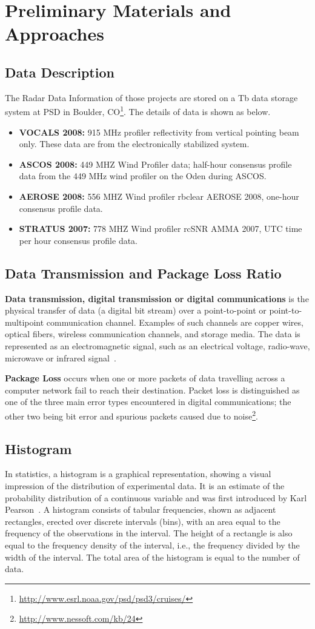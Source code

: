 \documentclass[times, 10pt,onecolumn]{article} %
\begin{document}
\section{Preliminary Materials and Approaches}
\subsection{Data Description}
The Radar Data Information of those projects are stored on a Tb data storage system at PSD in Boulder, CO\footnote{\url{http://www.esrl.noaa.gov/psd/psd3/cruises/}}. The details of data is shown as below.
\begin{itemize}
  \item \textbf{VOCALS 2008:} 915 MHz profiler reflectivity from vertical pointing beam only. These data are from the electronically stabilized system. 
\item \textbf{ASCOS 2008:} 449 MHZ Wind Profiler data; half-hour consensus profile data from the 449 MHz wind profiler on the Oden during ASCOS.  
\item \textbf{AEROSE 2008:} 556 MHZ Wind profiler rbclear AEROSE 2008, one-hour consensus profile data.
\item \textbf{STRATUS 2007:} 778 MHZ Wind profiler rcSNR AMMA 2007, UTC time per hour consensus profile data.
\end{itemize}
\subsection{Data Transmission and Package Loss Ratio}
\textbf{Data transmission, digital transmission or digital communications} is the physical transfer of data (a digital bit stream) over a point-to-point or point-to-multipoint communication channel. Examples of such channels are copper wires, optical fibers, wireless communication channels, and storage media. The data is represented as an electromagnetic signal, such as an electrical voltage, radio-wave, microwave or infrared signal~\cite{PDAT}. 

\textbf{Package Loss} occurs when one or more packets of data travelling across a computer network fail to reach their destination. Packet loss is distinguished as one of the three main error types encountered in digital communications; the other two being bit error and spurious packets caused due to noise\footnote{\url{http://www.nessoft.com/kb/24}}.
\subsection{Histogram}
In statistics, a histogram is a graphical representation, showing a visual impression of the distribution of experimental data. It is an estimate of the probability distribution of a continuous variable and was first introduced by Karl Pearson~\cite{hist}. A histogram consists of tabular frequencies, shown as adjacent rectangles, erected over discrete intervals (bins), with an area equal to the frequency of the observations in the interval. The height of a rectangle is also equal to the frequency density of the interval, i.e., the frequency divided by the width of the interval. The total area of the histogram is equal to the number of data. 
\end{document}
